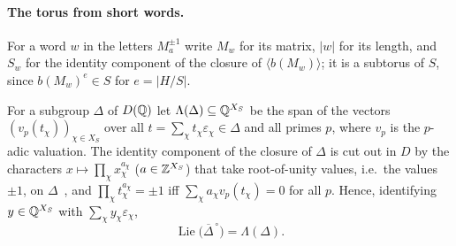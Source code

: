 \paragraph{The torus from short words.} For a word $w$ in the letters $M_a^{\pm1}$ write $M_w$ for its
matrix, $|w|$ for its length, and $S_w$ for the identity component of the closure of
$\langle b(M_w)\rangle$; it is a subtorus of $S$, since $b(M_w)^e\in S$ for $e=|H/S|$.

For a subgroup $\Delta$ of $D(\mathbb{Q})$ let $\Lambda(\Delta)\subseteq\mathbb{Q}^{X_S}$ be the span of the vectors
$(v_p(t_\chi))_{\chi\in X_S}$ over all $t=\sum_\chi t_\chi\varepsilon_\chi\in\Delta$ and all primes $p$,
where $v_p$ is the $p$-adic valuation. The identity component of the closure of $\Delta$ is cut out in
$D$ by the characters $x\mapsto\prod_\chi x_\chi^{a_\chi}$ ($a\in\mathbb{Z}^{X_S}$) that take root-of-unity
values, i.e.\ the values $\pm1$, on $\Delta$~\cite[8.2, 8.12]{Bor91}, and $\prod_\chi t_\chi^{a_\chi}=\pm1$
iff $\sum_\chi a_\chi v_p(t_\chi)=0$ for all $p$. Hence, identifying $y\in\mathbb{Q}^{X_S}$ with
$\sum_\chi y_\chi\varepsilon_\chi$,
\begin{equation}\label{eq:lietorus}
\operatorname{Lie}\bigl(\overline\Delta^{\,\circ}\bigr)=\Lambda(\Delta).
\end{equation}

